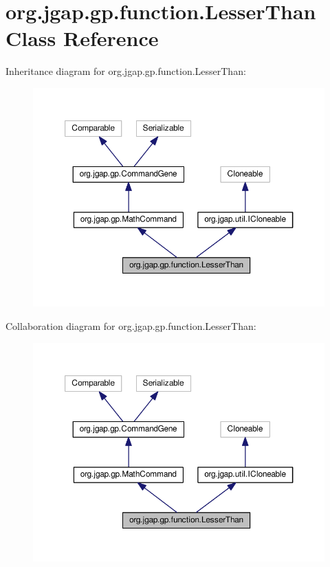 \hypertarget{classorg_1_1jgap_1_1gp_1_1function_1_1_lesser_than}{\section{org.\-jgap.\-gp.\-function.\-Lesser\-Than Class Reference}
\label{classorg_1_1jgap_1_1gp_1_1function_1_1_lesser_than}
}


Inheritance diagram for org.\-jgap.\-gp.\-function.\-Lesser\-Than\-:
\nopagebreak
\begin{figure}[H]
\begin{center}
\leavevmode
\includegraphics[width=350pt]{classorg_1_1jgap_1_1gp_1_1function_1_1_lesser_than__inherit__graph}
\end{center}
\end{figure}


Collaboration diagram for org.\-jgap.\-gp.\-function.\-Lesser\-Than\-:
\nopagebreak
\begin{figure}[H]
\begin{center}
\leavevmode
\includegraphics[width=350pt]{classorg_1_1jgap_1_1gp_1_1function_1_1_lesser_than__coll__graph}
\end{center}
\end{figure}
